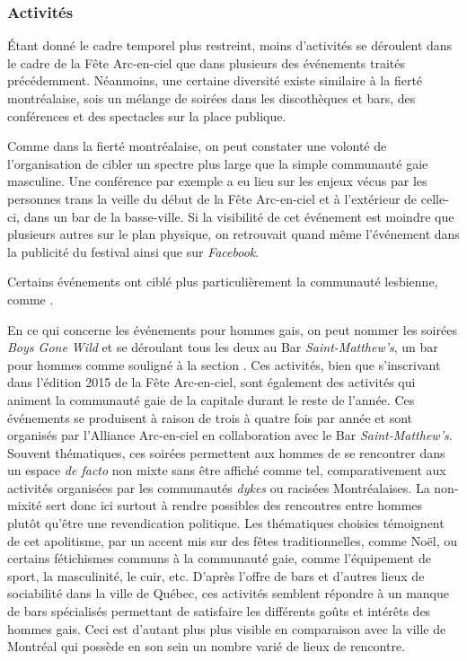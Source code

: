 \subsubsection{Activités}
\label{subsec:activitesfetearcenciel}
Étant donné le cadre temporel plus restreint, moins d'activités se déroulent dans le cadre de la Fête Arc-en-ciel que dans plusieurs des événements traités précédemment.
Néanmoins, une certaine diversité existe similaire à la fierté montréalaise, sois un mélange de soirées dans les discothèques et bars, des conférences et des spectacles sur la place publique.

Comme dans la fierté montréalaise, on peut constater une volonté de l'organisation de cibler un spectre plus large que la simple communauté gaie masculine.
Une conférence par exemple a eu lieu sur les enjeux vécus par les personnes trans la veille du début de la Fête Arc-en-ciel et à l'extérieur de celle-ci, dans un bar de la basse-ville.
Si la visibilité de cet événement est moindre que plusieurs autres sur le plan physique, on retrouvait quand même l'événement dans la publicité du festival ainsi que sur \emph{Facebook}.

Certains événements ont ciblé plus particulièrement la communauté lesbienne, comme .

En ce qui concerne les événements pour hommes gais, on peut nommer les soirées \emph{Boys Gone Wild} et  se déroulant tous les deux au Bar \emph{Saint-Matthew's}, un bar pour hommes comme souligné à la section .
Ces activités, bien que s'inscrivant dans l'édition 2015 de la Fête Arc-en-ciel, sont également des activités qui animent la communauté gaie de la capitale durant le reste de l'année.
Ces événements se produisent à raison de trois à quatre fois par année et sont organisés par l'Alliance Arc-en-ciel en collaboration avec le Bar \emph{Saint-Matthew's}.
Souvent thématiques, ces soirées permettent aux hommes de se rencontrer dans un espace \emph{de facto} non mixte sans être affiché comme tel, comparativement aux activités organisées par les communautés \emph{dykes} ou racisées Montréalaises.
La non-mixité sert donc ici surtout à rendre possibles des rencontres entre hommes plutôt qu'être une revendication politique.
Les thématiques choisies témoignent de cet apolitisme, par un accent mis sur des fêtes traditionnelles, comme Noël, ou certains fétichismes communs à la communauté gaie, comme l'équipement de sport, la masculinité, le cuir, etc.
D'après l'offre de bars et d'autres lieux de sociabilité dans la ville de Québec, ces activités semblent répondre à un manque de bars spécialisés permettant de satisfaire les différents goûts et intérêts des hommes gais.
Ceci est d'autant plus plus visible en comparaison avec la ville de Montréal qui possède en son sein un nombre varié de lieux de rencontre.

